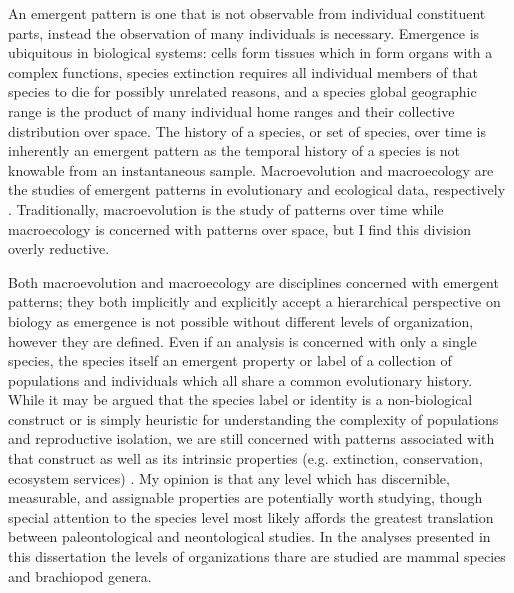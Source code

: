 An emergent pattern is one that is not observable from individual constituent parts, instead the observation of many individuals is necessary. Emergence is ubiquitous in biological systems: cells form tissues which in form organs with a complex functions, species extinction requires all individual members of that species to die for possibly unrelated reasons, and a species global geographic range is the product of many individual home ranges and their collective distribution over space. The history of a species, or set of species, over time is inherently an emergent pattern as the temporal history of a species is not knowable from an instantaneous sample. Macroevolution and macroecology are the studies of emergent patterns in evolutionary and ecological data, respectively \citep{Brown1989,Brown1995,Stanley1979,Stanley1975}. Traditionally, macroevolution is the study of patterns over time while macroecology is concerned with patterns over space, but I find this division overly reductive.

Both macroevolution and macroecology are disciplines concerned with emergent patterns; they both implicitly and explicitly accept a hierarchical perspective on biology as emergence is not possible without different levels of organization, however they are defined. Even if an analysis is concerned with only a single species, the species itself an emergent property or label of a collection of populations and individuals which all share a common evolutionary history. While it may be argued that the species label or identity is a non-biological construct or is simply heuristic for understanding the complexity of populations and reproductive isolation, we are still concerned with patterns associated with that construct as well as its intrinsic properties (e.g. extinction, conservation, ecosystem services) \citep{Coyne2004,Jablonski2008a}. My opinion is that any level which has discernible, measurable, and assignable properties are potentially worth studying, though special attention to the species level most likely affords the greatest translation between paleontological and neontological studies. In the analyses presented in this dissertation the levels of organizations thare are studied are mammal species and brachiopod genera.

